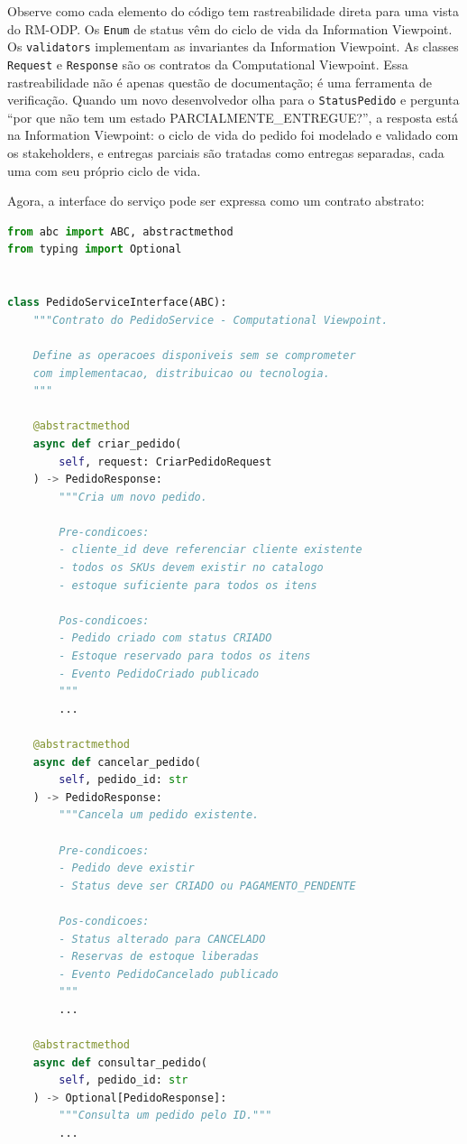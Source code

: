 Observe como cada elemento do código tem rastreabilidade direta para uma vista
do RM-ODP. Os \texttt{Enum} de status vêm do ciclo de vida da Information
Viewpoint. Os \texttt{validators} implementam as invariantes da Information
Viewpoint. As classes \texttt{Request} e \texttt{Response} são os contratos da
Computational Viewpoint. Essa rastreabilidade não é apenas questão de
documentação; é uma ferramenta de verificação. Quando um novo desenvolvedor
olha para o \texttt{StatusPedido} e pergunta ``por que não tem um estado
PARCIALMENTE\_ENTREGUE?'', a resposta está na Information Viewpoint: o ciclo de
vida do pedido foi modelado e validado com os stakeholders, e entregas parciais
são tratadas como entregas separadas, cada uma com seu próprio ciclo de vida.

Agora, a interface do serviço pode ser expressa como um contrato abstrato:

\begin{lstlisting}[language=Python, caption={Interface do PedidoService --- Computational Viewpoint}]
from abc import ABC, abstractmethod
from typing import Optional


class PedidoServiceInterface(ABC):
    """Contrato do PedidoService - Computational Viewpoint.

    Define as operacoes disponiveis sem se comprometer
    com implementacao, distribuicao ou tecnologia.
    """

    @abstractmethod
    async def criar_pedido(
        self, request: CriarPedidoRequest
    ) -> PedidoResponse:
        """Cria um novo pedido.

        Pre-condicoes:
        - cliente_id deve referenciar cliente existente
        - todos os SKUs devem existir no catalogo
        - estoque suficiente para todos os itens

        Pos-condicoes:
        - Pedido criado com status CRIADO
        - Estoque reservado para todos os itens
        - Evento PedidoCriado publicado
        """
        ...

    @abstractmethod
    async def cancelar_pedido(
        self, pedido_id: str
    ) -> PedidoResponse:
        """Cancela um pedido existente.

        Pre-condicoes:
        - Pedido deve existir
        - Status deve ser CRIADO ou PAGAMENTO_PENDENTE

        Pos-condicoes:
        - Status alterado para CANCELADO
        - Reservas de estoque liberadas
        - Evento PedidoCancelado publicado
        """
        ...

    @abstractmethod
    async def consultar_pedido(
        self, pedido_id: str
    ) -> Optional[PedidoResponse]:
        """Consulta um pedido pelo ID."""
        ...
\end{lstlisting}

